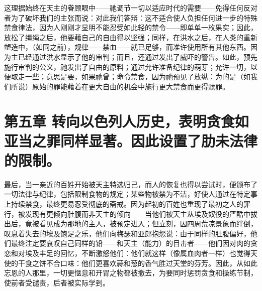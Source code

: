 这理据始终在天主的眷顾眼中——祂调节一切以适应时代的需要——免得任何反对者为了破坏我们的主张而说：对此我们答辩：这不适合使人负担任何进一步的特殊禁食律法，因为人刚刚才显明不能忍受如此轻的禁令——即单单一枚果实；因此，放松了缰绳之后，他要藉自己的自由得以坚强；同样，在洪水之后，在人类的重新塑造中，（如同之前），规律——禁血——就已足够，而准许使用所有其他东西。因为主已经通过洪水显示了他的审判；而且，还通过发出了威吓的警告。如此，预先施行审判的公义，祂发出了自由的原料；通过允许准备纪律的萌芽；允许一切，以便取走一些；意思是要，如果祂曾；命令禁食，因为祂预见了放纵：为的是（如我们所说）原始的罪能藉着在更大自由的机会中施行更大禁食而更得赎罪。\par


\section{第五章 转向以色列人历史，表明贪食如亚当之罪同样显著。因此设置了肋未法律的限制。}

最后，当一亲近的百姓开始被天主特选归己，而人的恢复也得以尝试时，便颁布了一切法律与纪律，包括限制食物的规定；某些物被禁为不洁，好使人通过在特定事上持续禁食，最终更易忍受彻底的斋戒。因为起初的百姓也重现了最初之人的罪行，被发现有更倾向肚腹而非天主的倾向——当他们被天主从埃及奴役的严酷中拔出后，竟被看见成为那地的主人，被预定进入；但立刻，因四周荒凉景象而绊倒，叹息着失去的埃及饱足之乐，他们向梅瑟和亚郎抱怨说：由于同样的肚腹偏好，他们最终注定要哀叹自己同样的铅——和天主（能力）的目击者——他们因对肉的贪恋和对埃及丰足的回忆，不断激怒他们：他们就这样（像属血肉者一样）也觉得天使的干食之饼不合口味：他们更喜欢蒜和葱的香气胜过天堂的芬芳。因此，从如此忘恩的人那里，一切更惬意和开胃之物都被撤去，为要同时惩罚贪食和操练节制，使前者受谴责，后者被实际学到。\par

